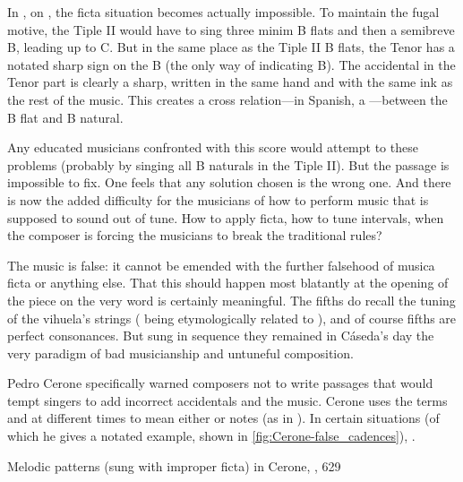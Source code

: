 In , on , the ficta situation becomes
actually impossible.
To maintain the fugal motive, the Tiple II would have to sing three minim B
flats and then a semibreve B\na, leading up to C.
But in the same place as the Tiple II B flats, the Tenor has a notated sharp
sign on the B (the only way of indicating B\na).
The accidental in the Tenor part is clearly a sharp, written in the same hand
and with the same ink as the rest of the music.
This creates a cross relation---in Spanish, a ---between
the B flat and B natural.

Any educated musicians confronted with this score would attempt to 
these problems (probably by singing all B naturals in the Tiple II).
But the passage is impossible to fix.
One feels that any solution chosen is the wrong one.
And there is now the added difficulty for the musicians of how to perform music
that is supposed to sound out of tune.
How to apply ficta, how to tune intervals, when the composer is forcing the
musicians to break the traditional rules?

The music is false: it cannot be emended with the further falsehood of musica
ficta or anything else.
That this should happen most blatantly at the opening of the piece on the very
word  is certainly meaningful.
The fifths do recall the tuning of the vihuela's strings (
being etymologically related to ), and of course fifths are
perfect consonances.
But sung in sequence they remained in Cáseda's day the very paradigm of bad
musicianship and untuneful composition.

Pedro Cerone specifically warned composers not to write passages that would
tempt singers to add incorrect accidentals and  the music.
Cerone uses the terms  and  at different
times to mean either  or  notes (as in
).
In certain situations (of which he gives a notated example, shown in
\cref{fig:Cerone-false_cadences}), .%
    \Autocite[629]{Cerone:Melopeo}

{Melodic patterns  (sung with improper
ficta) in Cerone, , 629} 

